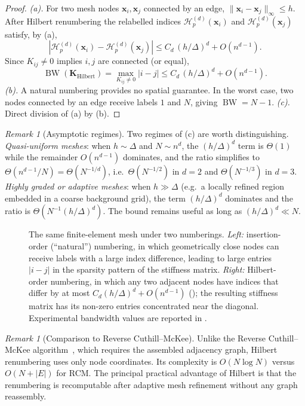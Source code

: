 \documentclass[11pt,a4paper]{article}
\theoremstyle{plain}
\theoremstyle{definition}
\theoremstyle{remark}
\newtheorem{remark}[theorem]{Remark}
\newcommand{\Hil}{\mathcal{H}}
\DeclareMathOperator{\BW}{BW}
\begin{document}
\begin{proof}
\emph{(a).} For two mesh nodes $\mathbf{x}_i,\mathbf{x}_j$ connected by
an edge, $\|\mathbf{x}_i-\mathbf{x}_j\|_\infty\leq h$. After Hilbert
renumbering the relabelled indices $\Hil_p^{(d)}(\mathbf{x}_i)$ and
$\Hil_p^{(d)}(\mathbf{x}_j)$ satisfy, by (a),
\[
|\Hil_p^{(d)}(\mathbf{x}_i)-\Hil_p^{(d)}(\mathbf{x}_j)|
\leq C_d\,(h/\Delta)^d + O(n^{d-1}).
\]
Since $K_{ij}\ne 0$ implies $i,j$ are connected (or equal),
\[
\BW(\mathbf{K}_{\mathrm{Hilbert}})
= \max_{K_{ij}\ne 0} |i-j|
\leq C_d\,(h/\Delta)^d + O(n^{d-1}).
\]
\emph{(b).} A natural numbering provides no spatial guarantee. In the
worst case, two nodes connected by an edge receive labels $1$ and $N$,
giving $\BW = N-1$.
\emph{(c).} Direct division of (a) by (b).
\end{proof}

\begin{remark}[Asymptotic regimes]\label{rem:bandwidth_regimes}
Two regimes of (c) are worth distinguishing.
\emph{Quasi-uniform meshes}: when $h\sim\Delta$ and $N\sim n^d$, the
$(h/\Delta)^d$ term is $\Theta(1)$ while the remainder $O(n^{d-1})$
dominates, and the ratio simplifies to $\Theta(n^{d-1}/N)
= \Theta(N^{-1/d})$, i.e.\ $\Theta(N^{-1/2})$ in $d=2$ and
$\Theta(N^{-1/3})$ in $d=3$.
\emph{Highly graded or adaptive meshes}: when $h\gg\Delta$ (e.g.\ a
locally refined region embedded in a coarse background grid), the term
$(h/\Delta)^d$ dominates and the ratio is $\Theta(N^{-1}(h/\Delta)^d)$.
The bound remains useful as long as $(h/\Delta)^d \ll N$.
\end{remark}

\begin{figure}[!htbp]
  \centering
  
  \caption{The same finite-element mesh under two numberings.
  \emph{Left:} insertion-order (``natural'') numbering, in which
  geometrically close nodes can receive labels with a large index
  difference, leading to large entries $|i-j|$ in the sparsity pattern
  of the stiffness matrix. \emph{Right:} Hilbert-order numbering,
  in which any two adjacent nodes have indices that differ by at
  most $C_d (h/\Delta)^d + O(n^{d-1})$ (); the
  resulting stiffness matrix has its non-zero entries concentrated
  near the diagonal. Experimental bandwidth values are reported in
  .}
  \label{fig:fem_mesh}
\end{figure}

\begin{remark}[Comparison to Reverse Cuthill--McKee]
Unlike the Reverse Cuthill--McKee
algorithm~\cite{cuthill1969}, which requires the assembled adjacency
graph, Hilbert renumbering uses only node coordinates. Its complexity
is $O(N\log N)$ versus $O(N+|E|)$ for RCM. The principal practical
advantage of Hilbert is that the renumbering is recomputable after
adaptive mesh refinement without any graph reassembly.
\end{remark}
\end{document}

